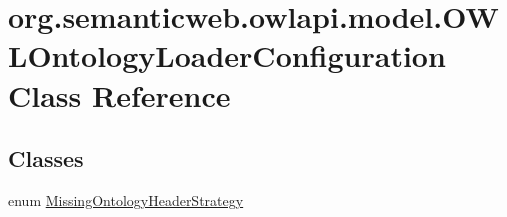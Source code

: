 \hypertarget{classorg_1_1semanticweb_1_1owlapi_1_1model_1_1_o_w_l_ontology_loader_configuration}{\section{org.\-semanticweb.\-owlapi.\-model.\-O\-W\-L\-Ontology\-Loader\-Configuration Class Reference}
\label{classorg_1_1semanticweb_1_1owlapi_1_1model_1_1_o_w_l_ontology_loader_configuration}
}
\subsection*{Classes}
\begin{DoxyCompactItemize}
\item 
enum \hyperlink{enumorg_1_1semanticweb_1_1owlapi_1_1model_1_1_o_w_l_ontology_loader_configuration_1_1_missing_ontology_header_strategy}{Missing\-Ontology\-Header\-Strategy}
\end{DoxyCompactItemize}
